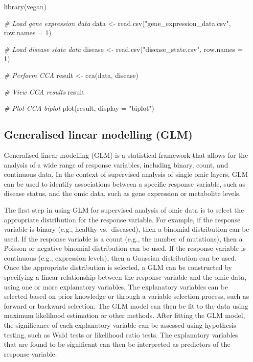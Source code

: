 \documentclass[
]{book}
\newenvironment{Shaded}{\begin{snugshade}}{\end{snugshade}}
\newcommand{\AttributeTok}[1]{\textcolor[rgb]{0.77,0.63,0.00}{#1}}
\newcommand{\CommentTok}[1]{\textcolor[rgb]{0.56,0.35,0.01}{\textit{#1}}}
\newcommand{\DecValTok}[1]{\textcolor[rgb]{0.00,0.00,0.81}{#1}}
\newcommand{\FunctionTok}[1]{\textcolor[rgb]{0.00,0.00,0.00}{#1}}
\newcommand{\NormalTok}[1]{#1}
\newcommand{\OtherTok}[1]{\textcolor[rgb]{0.56,0.35,0.01}{#1}}
\newcommand{\StringTok}[1]{\textcolor[rgb]{0.31,0.60,0.02}{#1}}
\begin{document}
\begin{Shaded}
\begin{Highlighting}[]
\FunctionTok{library}\NormalTok{(vegan)}

\CommentTok{\# Load gene expression data}
\NormalTok{data }\OtherTok{\textless{}{-}} \FunctionTok{read.csv}\NormalTok{(}\StringTok{"gene\_expression\_data.csv"}\NormalTok{, }\AttributeTok{row.names =} \DecValTok{1}\NormalTok{)}

\CommentTok{\# Load disease state data}
\NormalTok{disease }\OtherTok{\textless{}{-}} \FunctionTok{read.csv}\NormalTok{(}\StringTok{"disease\_state.csv"}\NormalTok{, }\AttributeTok{row.names =} \DecValTok{1}\NormalTok{)}

\CommentTok{\# Perform CCA}
\NormalTok{result }\OtherTok{\textless{}{-}} \FunctionTok{cca}\NormalTok{(data, disease)}

\CommentTok{\# View CCA results}
\NormalTok{result}

\CommentTok{\# Plot CCA biplot}
\FunctionTok{plot}\NormalTok{(result, }\AttributeTok{display =} \StringTok{"biplot"}\NormalTok{)}
\end{Highlighting}
\end{Shaded}

\hypertarget{generalised-linear-modelling}{%
\subsection{Generalised linear modelling (GLM)}\label{generalised-linear-modelling}}

Generalised linear modelling (GLM) is a statistical framework that allows for the analysis of a wide range of response variables, including binary, count, and continuous data. In the context of supervised analysis of single omic layers, GLM can be used to identify associations between a specific response variable, such as disease status, and the omic data, such as gene expression or metabolite levels.

The first step in using GLM for supervised analysis of omic data is to select the appropriate distribution for the response variable. For example, if the response variable is binary (e.g., healthy vs.~diseased), then a binomial distribution can be used. If the response variable is a count (e.g., the number of mutations), then a Poisson or negative binomial distribution can be used. If the response variable is continuous (e.g., expression levels), then a Gaussian distribution can be used. Once the appropriate distribution is selected, a GLM can be constructed by specifying a linear relationship between the response variable and the omic data, using one or more explanatory variables. The explanatory variables can be selected based on prior knowledge or through a variable selection process, such as forward or backward selection. The GLM model can then be fit to the data using maximum likelihood estimation or other methods. After fitting the GLM model, the significance of each explanatory variable can be assessed using hypothesis testing, such as Wald tests or likelihood ratio tests. The explanatory variables that are found to be significant can then be interpreted as predictors of the response variable.
\end{document}
